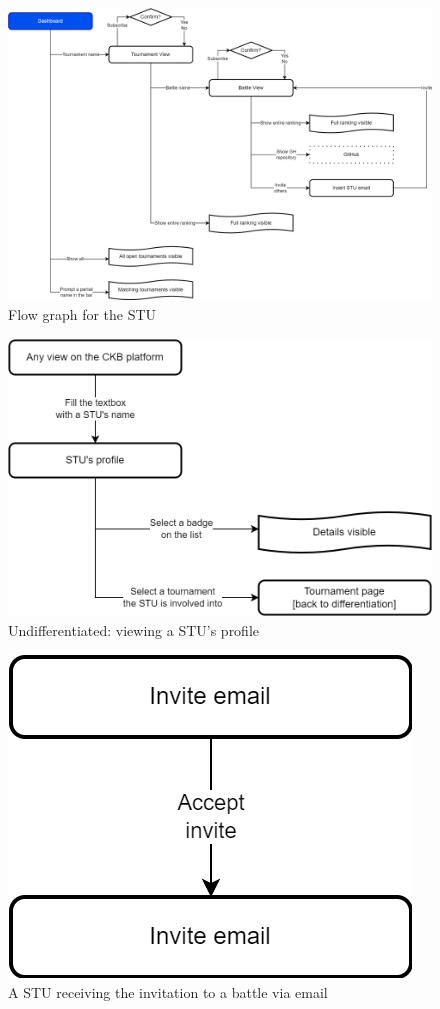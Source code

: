 \begin{figure}[H]
    \centering
    \includegraphics[width=\textwidth]{images/UX/UX-STU.drawio.png}
    \caption{Flow graph for the STU}
\end{figure}

\begin{figure}[H]
    \centering
    \includegraphics[width=\textwidth]{images/UX/UX-STU_profile.drawio.png}
    \caption{Undifferentiated: viewing a STU's profile}
\end{figure}


\begin{figure}[H]
    \centering
    \includegraphics[width=.4\textwidth]{images/UX/UX-Get_invited.drawio.png}
    \caption{A STU receiving the invitation to a battle via email}
\end{figure}